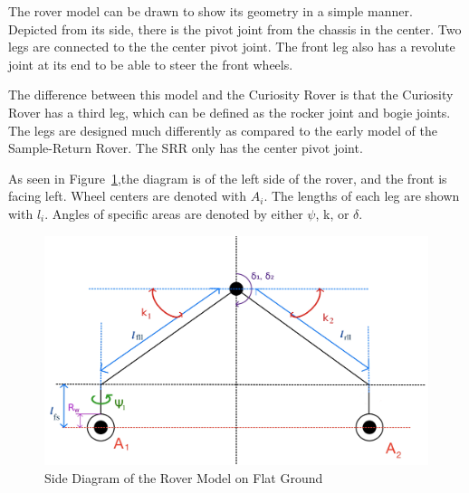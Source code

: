 The rover model can be drawn to show its geometry in a simple manner. Depicted from its side, there is the pivot joint from the chassis in the center. Two legs are connected to the the center pivot joint. The front leg also has a revolute joint at its end to be able to steer the front wheels.

The difference between this model and the Curiosity Rover is that the Curiosity Rover has a third leg, which can be defined as the rocker joint and bogie joints. The legs are designed much differently as compared to the early model of the Sample-Return Rover. The SRR only has the center pivot joint.

As seen in Figure~\ref{traction_control:algorithms:side-diagram},the diagram is of the left side of the rover, and the front is facing left. Wheel centers are denoted with $A_{i}$. The lengths of each leg are shown with $l_{i}$. Angles of specific areas are denoted by either $\psi$, k, or $\delta$. 


\begin{figure}[H]
	\centering
	\includegraphics[scale=0.3]{sections/algorithms/images/side-diagram.png}	
	\caption{Side Diagram of the Rover Model on Flat Ground}	
	\label{traction_control:algorithms:side-diagram}
\end{figure}

